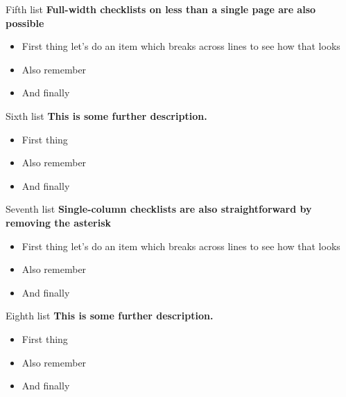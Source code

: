 \documentclass[9pt,bestpractices]{livecoms}
\begin{document}
\begin{Checklists*}[h]

\begin{checklist}{Fifth list}
\textbf{Full-width checklists on less than a single page are also possible}
\begin{itemize}
\item First thing let's do an item which breaks across lines to see how that looks
\item Also remember
\item And finally
\end{itemize}
\end{checklist}

\begin{checklist}{Sixth list}
\textbf{This is some further description.}
\begin{itemize}
\item First thing
\item Also remember
\item And finally
\end{itemize}
\end{checklist}

\end{Checklists*}



\begin{Checklists}

\begin{checklist}{Seventh list}
\textbf{Single-column checklists are also straightforward by removing the asterisk}
\begin{itemize}
\item First thing let's do an item which breaks across lines to see how that looks
\item Also remember
\item And finally
\end{itemize}
\end{checklist}

\begin{checklist}{Eighth list}
\textbf{This is some further description.}
\begin{itemize}
\item First thing
\item Also remember
\item And finally
\end{itemize}
\end{checklist}

\end{Checklists}
\end{document}
